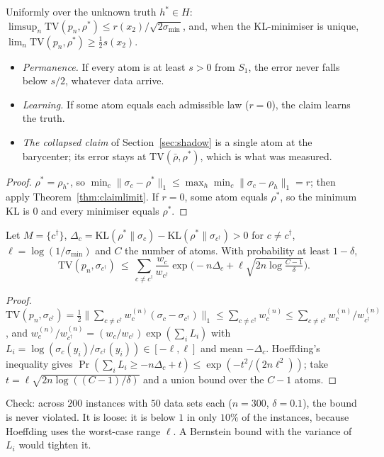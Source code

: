 \begin{corollary}\label{cor:permanent}
Uniformly over the unknown truth $h^*\in H$: $\limsup_n\mathrm{TV}(p_n,\rho^*)\le r(x_2)/\sqrt{2\sigma_{\min}}$, and, when the KL-minimiser is unique, $\lim_n\mathrm{TV}(p_n,\rho^*)\ge\frac12 s(x_2)$.
\begin{itemize}
  \item \emph{Permanence.} If every atom is at least $s>0$ from $S_1$, the error never falls below $s/2$, whatever data arrive.
  \item \emph{Learning.} If some atom equals each admissible law ($r=0$), the claim learns the truth.
  \item \emph{The collapsed claim} of Section~\ref{sec:shadow} is a single atom at the barycenter; its error stays at $\mathrm{TV}(\bar\rho,\rho^*)$, which is what was measured.
\end{itemize}
\end{corollary}
\begin{proof}
$\rho^*=\rho_{h^*}$, so $\min_c\|\sigma_c-\rho^*\|_1\le\max_h\min_c\|\sigma_c-\rho_h\|_1=r$; then apply Theorem~\ref{thm:claimlimit}. If $r=0$, some atom equals $\rho^*$, so the minimum KL is $0$ and every minimiser equals $\rho^*$.
\end{proof}

\begin{theorem}\label{thm:claimrate}
Let $M=\{c^\dagger\}$, $\Delta_c=\mathrm{KL}(\rho^*\|\sigma_c)-\mathrm{KL}(\rho^*\|\sigma_{c^\dagger})>0$ for $c\ne c^\dagger$, $\ell=\log(1/\sigma_{\min})$ and $C$ the number of atoms. With probability at least $1-\delta$,
\[\mathrm{TV}(p_n,\sigma_{c^\dagger})\ \le\ \sum_{c\ne c^\dagger}\frac{w_c}{w_{c^\dagger}}\exp\!\Big(-n\Delta_c+\ell\sqrt{2n\log\tfrac{C-1}{\delta}}\Big).\]
\end{theorem}
\begin{proof}
$\mathrm{TV}(p_n,\sigma_{c^\dagger})=\frac12\|\sum_{c\ne c^\dagger}w^{(n)}_c(\sigma_c-\sigma_{c^\dagger})\|_1\le\sum_{c\ne c^\dagger}w^{(n)}_c\le\sum_{c\ne c^\dagger}w^{(n)}_c/w^{(n)}_{c^\dagger}$, and $w^{(n)}_c/w^{(n)}_{c^\dagger}=(w_c/w_{c^\dagger})\exp(\sum_iL_i)$ with $L_i=\log(\sigma_c(y_i)/\sigma_{c^\dagger}(y_i))\in[-\ell,\ell]$ and mean $-\Delta_c$. Hoeffding's inequality \cite{hoeffding63} gives $\Pr(\sum_iL_i\ge-n\Delta_c+t)\le\exp(-t^2/(2n\ell^2))$; take $t=\ell\sqrt{2n\log((C-1)/\delta)}$ and a union bound over the $C-1$ atoms.
\end{proof}
Check: across $200$ instances with $50$ data sets each ($n=300$, $\delta=0.1$), the bound is never violated. It is loose: it is below $1$ in only $10\%$ of the instances, because Hoeffding uses the worst-case range $\ell$. A Bernstein bound with the variance of $L_i$ would tighten it.

